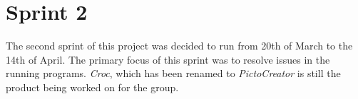\chapter{Sprint 2}
The second sprint of this project was decided to run from 20th of March to the 14th of April.
The primary focus of this sprint was to resolve issues in the running programs.
\textit{Croc}, which has been renamed to \textit{PictoCreator} is still the product being worked on for the group.


